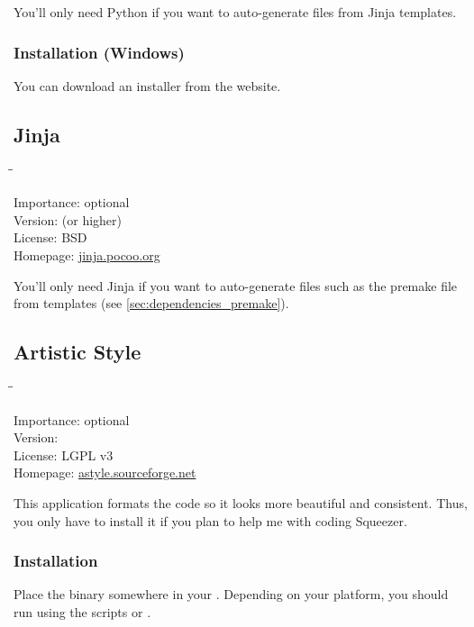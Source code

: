 You'll only need Python if you want to auto-generate files from Jinja
templates.

\subsubsection{Installation (Windows)}

You can download an installer from the website.

\subsection{Jinja}

\begin{tabbing}
  \hspace*{6em}\=\=\kill

  Importance:  \> optional \\
  Version:      (or higher) \\
  License:     \> BSD \\
  Homepage:    \> \href{http://jinja.pocoo.org/}{jinja.pocoo.org}
\end{tabbing}

You'll only need Jinja if you want to auto-generate files such as the
premake file from templates (see \ref{sec:dependencies_premake}).

\subsection{Artistic Style}

\begin{tabbing}
  \hspace*{6em}\=\=\kill

  Importance:  \> optional \\
  Version:      \\
  License:     \> LGPL v3 \\
  Homepage:    \> \href{http://astyle.sourceforge.net/}{astyle.sourceforge.net}
\end{tabbing}

This application formats the code so it looks more beautiful and
consistent.  Thus, you only have to install it if you plan to help me
with coding Squeezer.

\subsubsection{Installation}

Place the binary somewhere in your .  Depending on your
platform, you should run  using the scripts
 or .

